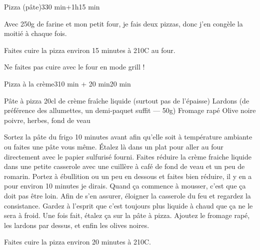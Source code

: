 \begin{recette}{Pizza (pâte)}{3}{30 min+1h}{15 min}
\begin{remarque}
Avec 250g de farine et mon petit four, je fais deux pizzas, donc j'en congèle la moitié à chaque fois.
\end{remarque}


\begin{cuisson}
Faites cuire la pizza environ 15 minutes à 210\degres C au four.

\begin{attention}
Ne faites pas cuire avec le four en mode grill !
\end{attention}

\end{cuisson}


\end{recette}

\begin{recette}{Pizza à la crème}{3}{10 min + 20 min}{20 min}
\begin{ingredients}
\ingredient Pâte à pizza
\ingredient 20cl de crème fraîche liquide (surtout pas de l'épaisse)
\ingredient Lardons (de préférence des allumettes, un demi-paquet suffit --- 50g)
\ingredient Fromage rapé
\ingredient Olive noire
\ingredient poivre, herbes, fond de veau
\end{ingredients}

\begin{preparation}
\etape Sortez la pâte du frigo 10 minutes avant afin qu'elle soit à température ambiante ou faites une pâte vous même.
\etape Étalez là dans un plat pour aller au four directement avec le papier sulfurisé fourni.
\etape Faites réduire la crème fraiche liquide dans une petite casserole avec une cuillère à café de fond de veau et un peu de romarin. Portez à ébullition ou un peu en dessous et faites bien réduire, il y en a pour environ 10 minutes je dirais. Quand ça commence à mousser, c'est que ça doit pas être loin. Afin de s'en assurer, éloigner la casserole du feu et regardez la consistance. Gardez à l'esprit que c'est toujours plus liquide à chaud que ça ne le sera à froid.
\etape Une fois fait, étalez ça sur la pâte à pizza. Ajoutez le fromage rapé, les lardons par dessus, et enfin les olives noires.
\end{preparation}

\begin{cuisson}
Faites cuire la pizza environ 20 minutes à 210\degres C.
\end{cuisson}


\end{recette}

